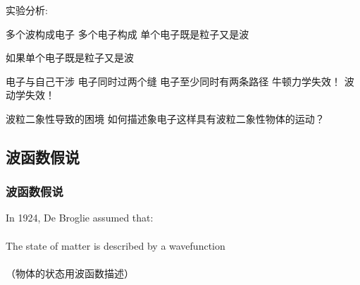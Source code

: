 \begin{frame}
    \frametitle{}
    实验分析:\\
    \begin{itemize}
        \Item 多个波构成电子 
        \Item 多个电子构成 
        \Item 单个电子既是粒子又是波 
    \end{itemize}
\end{frame}

\begin{frame}
    如果单个电子既是粒子又是波 \\
\begin{itemize}
    \Item  电子与自己干涉 
    \Item  电子同时过两个缝  
    \Item  电子至少同时有两条路径 
    \Item  牛顿力学失效！ 
    \Item  波动学失效！ 
\end{itemize}
\end{frame}

\begin{frame}
    \centering
    \begin{tcbb}[0.68]{波粒二象性导致的困境}
        {如何描述象电子这样具有波粒二象性物体的运动？}
    \end{tcbb}
\end{frame}

\subsection{波函数假说}

\begin{frame}
    \frametitle{波函数假说}
    \begin{tcolorbox4}
    In 1924, De Broglie assumed that:\\
    ~\\
    The state of matter is described by a wavefunction \\
    ~\\
    （物体的状态用波函数描述）
    \end{tcolorbox4}
\end{frame}

